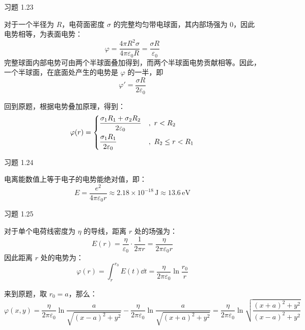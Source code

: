 \begin{problem}
	习题 1.23
	\begin{solution}
		对于一个半径为 $R$，电荷面密度 $\sigma$ 的完整均匀带电球面，其内部场强为 $0$，因此电势相等，为表面电势：
		$$
		\varphi = \frac{4 \pi R^2 \sigma}{4 \pi \varepsilon_0 R} = \frac{\sigma R}{\varepsilon_0}
		$$
		完整球面内部电势可由两个半球面叠加得到，而两个半球面电势贡献相等。因此，一个半球面，在底面处产生的电势是 $\varphi$ 的一半，即
		$$
		\varphi' = \frac{\sigma R}{2 \varepsilon_0}
		$$

		回到原题，根据电势叠加原理，得到：
		$$
		\varphi(r) = \begin{dcases}
			\frac{\sigma_1 R_1 + \sigma_2 R_2}{2 \varepsilon_0} &,\ r < R_2 \\
			\frac{\sigma_1 R_1}{2 \varepsilon_0} &,\ R_2 \le r < R_1 \\
		\end{dcases}
		$$
	\end{solution}
\end{problem}

\begin{problem}
	习题 1.24
	\begin{solution}
		电离能数值上等于电子的电势能绝对值，即：
		$$
		E = \frac{e^2}{4 \pi \varepsilon_0 r} \approx 2.18 \times 10^{-18} \,\mathrm{J} \approx 13.6 \,\mathrm{eV}
		$$
	\end{solution}
\end{problem}

\begin{problem}
	习题 1.25
	\begin{solution}
		对于单个电荷线密度为 $\eta$ 的导线，距离 $r$ 处的场强为：
		$$
		E(r) = \frac{\eta}{\varepsilon_0} \cdot \frac{1}{2 \pi r} = \frac{\eta}{2 \pi \varepsilon_0 r}
		$$
		因此距离 $r$ 处的电势为：
		$$
		\varphi(r) = \int_{r}^{r_0} E(t) \dd{t} = \frac{\eta}{2 \pi \varepsilon_0} \ln \frac{r_0}{r}
		$$

		来到原题，取 $r_0 = a$，那么：
		$$
		\varphi(x, y) = \frac{\eta}{2\pi \varepsilon_0} \ln \frac{a}{\sqrt{(x - a)^2 + y^2}} - \frac{\eta}{2\pi \varepsilon_0} \ln \frac{a}{\sqrt{(x + a)^2 + y^2}} = \frac{\eta}{2\pi \varepsilon_0} \ln \sqrt{\frac{(x + a)^2 + y^2}{(x - a)^2 + y^2}}
		$$
	\end{solution}
\end{problem}